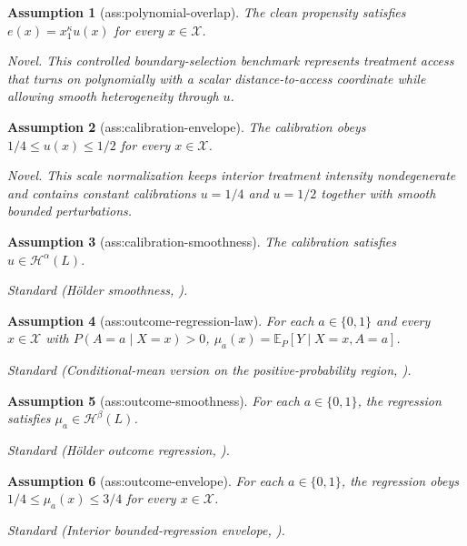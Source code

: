 \documentclass{article}
\newtheorem{assumption}{Assumption}
\begin{document}
\begin{assumption}[ass:polynomial-overlap]\label{ass:polynomial-overlap}
The clean propensity satisfies \(e(x)=x_1^\kappa u(x)\) for every \(x\in\mathcal X\).
\par\smallskip\noindent\emph{Novel.} This controlled boundary-selection benchmark represents treatment access that turns on polynomially with a scalar distance-to-access coordinate while allowing smooth heterogeneity through \(u\).
\end{assumption}

\begin{assumption}[ass:calibration-envelope]\label{ass:calibration-envelope}
The calibration obeys \(1/4\leq u(x)\leq1/2\) for every \(x\in\mathcal X\).
\par\smallskip\noindent\emph{Novel.} This scale normalization keeps interior treatment intensity nondegenerate and contains constant calibrations \(u=1/4\) and \(u=1/2\) together with smooth bounded perturbations.
\end{assumption}

\begin{assumption}[ass:calibration-smoothness]\label{ass:calibration-smoothness}
The calibration satisfies \(u\in\mathcal H^\alpha(L)\).
\par\smallskip\noindent\emph{Standard} (Hölder smoothness, \cite{Stone1982}).
\end{assumption}

\begin{assumption}[ass:outcome-regression-law]\label{ass:outcome-regression-law}
For each \(a\in\{0,1\}\) and every \(x\in\mathcal X\) with \(P(A=a\mid X=x)>0\), \(\mu_a(x)=\mathbb E_P[Y\mid X=x,A=a]\).
\par\smallskip\noindent\emph{Standard} (Conditional-mean version on the positive-probability region, \cite{Stone1982}).
\end{assumption}

\begin{assumption}[ass:outcome-smoothness]\label{ass:outcome-smoothness}
For each \(a\in\{0,1\}\), the regression satisfies \(\mu_a\in\mathcal H^\beta(L)\).
\par\smallskip\noindent\emph{Standard} (Hölder outcome regression, \cite{Stone1982}).
\end{assumption}

\begin{assumption}[ass:outcome-envelope]\label{ass:outcome-envelope}
For each \(a\in\{0,1\}\), the regression obeys \(1/4\leq\mu_a(x)\leq3/4\) for every \(x\in\mathcal X\).
\par\smallskip\noindent\emph{Standard} (Interior bounded-regression envelope, \cite{RobinsEtAl2017HOEE}).
\end{assumption}
\end{document}
